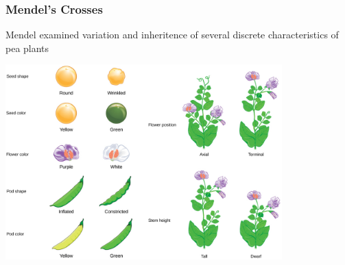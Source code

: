 \documentclass{beamer}
\begin{document}
\begin{frame}
	\frametitle{Mendel's Crosses}
	\centering
	Mendel examined variation and inheritence of several discrete characteristics of pea plants
	\vspace{10pt}

			\includegraphics[keepaspectratio, width  =0.8\textwidth]{img/mendelCross_2}
\end{frame}
\end{document}
